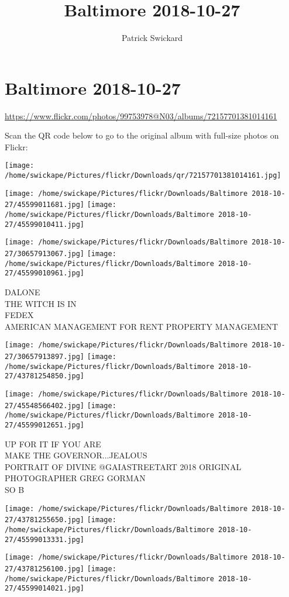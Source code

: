 \documentclass[10pt,letterpaper]{article}
\title{Baltimore 2018-10-27}
\author{Patrick Swickard}
\date{}
\begin{document}
\section*{Baltimore 2018-10-27}

\url{https://www.flickr.com/photos/99753978@N03/albums/72157701381014161}

Scan the QR code below to go to the original album with full-size photos on Flickr:

\texttt{[image: /home/swickape/Pictures/flickr/Downloads/qr/72157701381014161.jpg]}
\pagebreak

\texttt{[image: /home/swickape/Pictures/flickr/Downloads/Baltimore 2018-10-27/45599011681.jpg]}
\texttt{[image: /home/swickape/Pictures/flickr/Downloads/Baltimore 2018-10-27/45599010411.jpg]}

\texttt{[image: /home/swickape/Pictures/flickr/Downloads/Baltimore 2018-10-27/30657913067.jpg]}
\texttt{[image: /home/swickape/Pictures/flickr/Downloads/Baltimore 2018-10-27/45599010961.jpg]}

DALONE\\
THE WITCH IS IN\\
FEDEX\\
AMERICAN MANAGEMENT FOR RENT PROPERTY MANAGEMENT
\pagebreak

\texttt{[image: /home/swickape/Pictures/flickr/Downloads/Baltimore 2018-10-27/30657913897.jpg]}
\texttt{[image: /home/swickape/Pictures/flickr/Downloads/Baltimore 2018-10-27/43781254850.jpg]}

\texttt{[image: /home/swickape/Pictures/flickr/Downloads/Baltimore 2018-10-27/45548566402.jpg]}
\texttt{[image: /home/swickape/Pictures/flickr/Downloads/Baltimore 2018-10-27/45599012651.jpg]}

UP FOR IT IF YOU ARE\\
MAKE THE GOVERNOR...JEALOUS\\
PORTRAIT OF DIVINE @GAIASTREETART 2018 ORIGINAL PHOTOGRAPHER GREG GORMAN\\
SO B
\pagebreak

\texttt{[image: /home/swickape/Pictures/flickr/Downloads/Baltimore 2018-10-27/43781255650.jpg]}
\texttt{[image: /home/swickape/Pictures/flickr/Downloads/Baltimore 2018-10-27/45599013331.jpg]}

\texttt{[image: /home/swickape/Pictures/flickr/Downloads/Baltimore 2018-10-27/43781256100.jpg]}
\texttt{[image: /home/swickape/Pictures/flickr/Downloads/Baltimore 2018-10-27/45599014021.jpg]}
\end{document}

